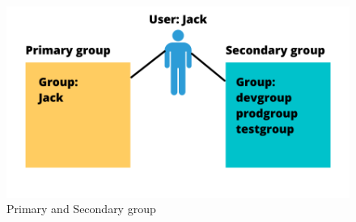 \begin{flushleft}
	\begin{figure}[h!]
		\centering
		\includegraphics[scale=0.5]{content/chapter4/images/type_group.png}
		\caption{Primary and Secondary group}
		\label{fig:prime_secondary_group}
	\end{figure}
	


\end{flushleft}

\newpage

